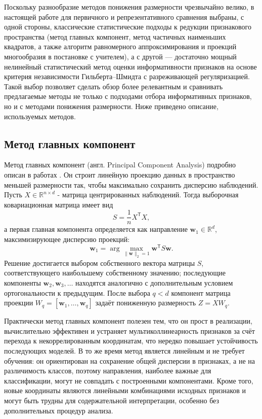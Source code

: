 \documentclass[12pt,a4paper]{article}
\begin{document}
Поскольку разнообразие методов понижения размерности чрезвычайно велико, в настоящей работе
для первичного и репрезентативного сравнения выбраны, с одной стороны, классические
статистические подходы к редукции признакового пространства (метод главных компонент,
метод частичных наименьших квадратов, а также алгоритм равномерного аппроксимирования
и проекций многообразия в постановке с учителем), а с другой — достаточно мощный
нелинейный статистический метод оценки информативности признаков на основе критерия
независимости Гильберта–Шмидта с разреживающей регуляризацией. Такой выбор позволяет
сделать обзор более релевантным и сравнивать предлагаемые методы не только с
подходами отбора информативных признаков, но и с методами понижения размерности.
Ниже приведено описание, используемых методов.

\subsection{Метод главных компонент}
Метод главных компонент (англ. Principal Component Analysis) подробно описан в работах 
\cite{Pearson1901,Hotelling1933}. Он строит линейную проекцию данных в пространство меньшей 
размерности так, чтобы максимально сохранить дисперсию наблюдений. Пусть 
$X \in \mathbb{R}^{n \times d}$ - матрица центрированных наблюдений. Тогда выборочная 
ковариационная матрица имеет вид
\begin{equation}
S = \frac{1}{n} X^{\mathsf T} X,
\end{equation}
а первая главная компонента определяется как направление $\mathbf{w}_1 \in \mathbb{R}^d$, 
максимизирующее дисперсию проекций:
\begin{equation}
\mathbf{w}_1 = \arg\max_{\|\mathbf{w}\|_2=1} \mathbf{w}^{\mathsf T} S \mathbf{w}.
\end{equation}
Решение достигается выбором собственного вектора матрицы $S$, соответствующего наибольшему 
собственному значению; последующие компоненты $\mathbf{w}_2,\mathbf{w}_3,\dots$ находятся 
аналогично с дополнительным условием ортогональности к предыдущим. После выбора $q<d$ компонент 
матрица проекции $W_q=[\mathbf{w}_1,\dots,\mathbf{w}_q]$ задаёт пониженную размерность 
$Z = X W_q$.

Практически метод главных компонент полезен тем, что он прост в реализации, вычислительно 
эффективен и устраняет мультиколлинеарность признаков за счёт перехода к некоррелированным 
координатам, что нередко повышает устойчивость последующих моделей. 
В то же время метод является линейным и не требует обучения: он ориентирован на сохранение общей 
дисперсии в признаках, а не на различимость классов, поэтому направления, наиболее важные для 
классификации, могут не совпадать с построенными компонентами. Кроме того, новые координаты являются 
линейными комбинациями исходных признаков и могут быть трудны для содержательной интерпретации, 
особенно без дополнительных процедур анализа.
\end{document}

